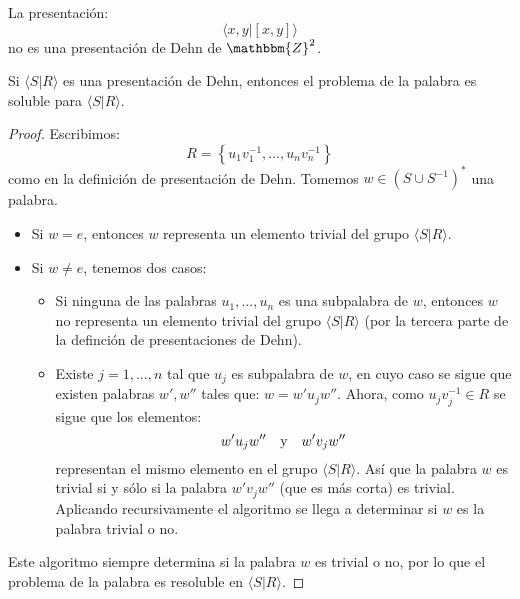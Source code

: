 \documentclass[12pt]{report}
\theoremstyle{largebreak}
\newcommand{\bbm}[1]{\ensuremath{\mathbbm{#1}}}
\newcommand{\gen}[1]{\ensuremath{\langle#1\rangle}}
\begin{document}
    \begin{exa}
        La presentación:
        \begin{equation*}
            \gen{x,y|[x,y]}
        \end{equation*}
        no es una presentación de Dehn de $\bbm{Z}^2$.
    \end{exa}

    \begin{propo}
        Si $\gen{S|R}$ es una presentación de Dehn, entonces el problema de la palabra es soluble para $\gen{S|R}$.
    \end{propo}

    \begin{proof}
        Escribimos:
        \begin{equation*}
            R=\left\{u_1v_1^{-1},...,u_nv_n^{-1} \right\}
        \end{equation*}
        como en la definición de presentación de Dehn. Tomemos $w\in(S\cup S^{-1})^*$ una palabra.
        \begin{itemize}
            \item Si $w=e$, entonces $w$ representa un elemento trivial del grupo $\gen{S|R}$.
            \item Si $w\neq e$, tenemos dos casos:
            \begin{itemize}
                \item Si ninguna de las palabras $u_1,...,u_n$ es una subpalabra de $w$, entonces $w$ no representa un elemento trivial del grupo $\gen{S|R}$ (por la tercera parte de la definción de presentaciones de Dehn).
                \item Existe $j=1,...,n$ tal que $u_j$ es subpalabra de $w$, en cuyo caso se sigue que existen palabras $w',w''$ tales que: $w=w'u_jw''$. Ahora, como $u_jv_j^{-1}\in R$ se sigue que los elementos:
                \begin{equation*}
                    w'u_jw''\quad\textup{y}\quad w'v_jw''
                \end{equation*}
                representan el mismo elemento en el grupo $\gen{S|R}$. Así que la palabra $w$ es trivial si y sólo si la palabra $w'v_jw''$ (que es más corta) es trivial. Aplicando recursivamente el algoritmo se llega a determinar si $w$ es la palabra trivial o no.
            \end{itemize}
        \end{itemize}
        Este algoritmo siempre determina si la palabra $w$ es trivial o no, por lo que el problema de la palabra es resoluble en $\gen{S|R}$.
    \end{proof}
\end{document}
